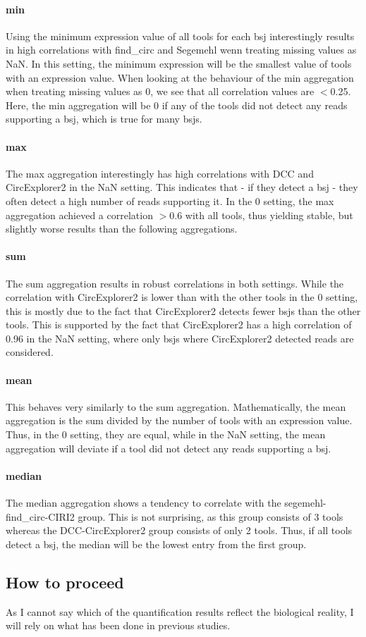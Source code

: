 \paragraph{min}
Using the minimum expression value of all tools for each \gls{bsj}
interestingly results in high correlations with find\_circ and Segemehl wenn
treating missing values as NaN.
In this setting, the minimum expression will be the smallest value of tools
with an expression value.
When looking at the behaviour of the min aggregation when treating missing
values as 0, we see that all correlation values are $<$0.25.
Here, the min aggregation will be 0 if any of the tools did not detect any
reads supporting a \gls{bsj}, which is true for many \gls{bsj}s.

\paragraph{max}
The max aggregation interestingly has high correlations with DCC and
CircExplorer2 in the NaN setting.
This indicates that - if they detect a \gls{bsj} - they often detect a high
number of reads supporting it.
In the 0 setting, the max aggregation achieved a correlation $>$0.6 with all
tools, thus yielding stable, but slightly worse results than the following
aggregations.

\paragraph{sum}
The sum aggregation results in robust correlations in both settings.
While the correlation with CircExplorer2 is lower than with the other tools in
the 0 setting, this is mostly due to the fact that CircExplorer2 detects fewer
\gls{bsj}s than the other tools.
This is supported by the fact that CircExplorer2 has a high correlation of 0.96
in the NaN setting, where only \gls{bsj}s where CircExplorer2 detected reads
are considered.

\paragraph{mean}
This behaves very similarly to the sum aggregation.
Mathematically, the mean aggregation is the sum divided by the number of tools
with an expression value.
Thus, in the 0 setting, they are equal, while in the NaN setting, the mean
aggregation will deviate if a tool did not detect any reads supporting a
\gls{bsj}.

\paragraph{median}
The median aggregation shows a tendency to correlate with the
segemehl-find\_circ-CIRI2 group.
This is not surprising, as this group consists of 3 tools whereas the
DCC-CircExplorer2 group consists of only 2 tools.
Thus, if all tools detect a \gls{bsj}, the median will be the lowest entry from
the first group.

\subsection{How to proceed}

As I cannot say which of the quantification results reflect the biological
reality, I will rely on what has been done in previous studies.
